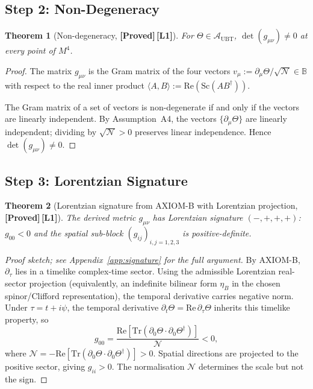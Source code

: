 \documentclass[12pt,a4paper]{article}
\newtheorem{theorem}{Theorem}[section]
\theoremstyle{definition}
\theoremstyle{remark}
\newcommand{\PROVED}{\textbf{[Proved]}}
\newcommand{\Lone}{\textbf{[L1]}}
\newcommand{\BB}{\mathbb{B}}
\newcommand{\Tr}{\mathrm{Tr}}
\newcommand{\re}{\mathrm{Re}}
\newcommand{\calA}{\mathcal{A}}
\newcommand{\calN}{\mathcal{N}}
\begin{document}
\subsection{Step 2: Non-Degeneracy}
\label{sec:step2}

\begin{theorem}[Non-degeneracy, \PROVED\,\Lone]
\label{thm:nondeg}
For $\Theta \in \calA_{\mathrm{UBT}}$,
$\det(g_{\mu\nu}) \neq 0$ at every point of $M^4$.
\end{theorem}

\begin{proof}
The matrix $g_{\mu\nu}$ is the Gram matrix of the four vectors
$v_\mu := \partial_\mu\Theta/\sqrt{\calN} \in \BB$
with respect to the real inner product
$\langle A,B\rangle := \re(\mathrm{Sc}(AB^\dagger))$.

The Gram matrix of a set of vectors is non-degenerate if and only if the vectors
are linearly independent.
By Assumption~A4, the vectors $\{\partial_\mu\Theta\}$ are linearly independent;
dividing by $\sqrt{\calN} > 0$ preserves linear independence.
Hence $\det(g_{\mu\nu}) \neq 0$.
\end{proof}

\subsection{Step 3: Lorentzian Signature}
\label{sec:step3}

\begin{theorem}[Lorentzian signature from AXIOM-B with Lorentzian projection, \PROVED\,\Lone]
\label{thm:signature}
The derived metric $g_{\mu\nu}$ has Lorentzian signature $(-,+,+,+)$:
$g_{00} < 0$ and the spatial sub-block $(g_{ij})_{i,j=1,2,3}$ is
positive-definite.
\end{theorem}

\begin{proof}[Proof sketch; see Appendix~\ref{app:signature} for the full argument]
By AXIOM-B, $\partial_\tau$ lies in a timelike complex-time sector.
Using the admissible Lorentzian real-sector projection (equivalently, an
indefinite bilinear form $\eta_B$ in the chosen spinor/Clifford
representation), the temporal derivative carries negative norm.
Under $\tau = t + i\psi$, the temporal derivative
$\partial_t\Theta = \re\,\partial_\tau\Theta$
inherits this timelike property, so
\[
  g_{00}
  = \frac{\re[\Tr(\partial_0\Theta \cdot \partial_0\Theta^\dagger)]}{\calN} < 0,
\]
where $\calN = -\re[\Tr(\partial_0\Theta \cdot \partial_0\Theta^\dagger)] > 0$.
Spatial directions are projected to the positive sector, giving $g_{ii} > 0$.
The normalisation $\calN$ determines the scale but not the sign.
\end{proof}
\end{document}
